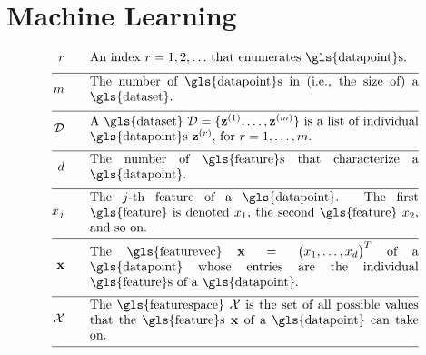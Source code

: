 \newpage
\section*{Machine Learning}

\begin{align}
	\sampleidx \quad\quad & \parbox{.75\textwidth}{An index $\sampleidx=1,2,\ldots$ that 
		enumerates \gls{datapoint}s.}   \nonumber \\[2mm] \hline \nonumber\\[-5mm]
	\samplesize \quad\quad &\parbox{.75\textwidth}{The number of \gls{datapoint}s in (i.e., the size of) a \gls{dataset}.} \nonumber \\[2mm] \hline \nonumber\\[-5mm] 
	\dataset \quad\quad & \parbox{.75\textwidth}{A \gls{dataset} $\dataset = \{ \datapoint^{(1)},\ldots, \datapoint^{(\samplesize)} \}$ 
		is a list of individual \gls{datapoint}s $\datapoint^{(\sampleidx)}$, for $\sampleidx=1,\ldots,\samplesize$.}   \nonumber \\[2mm] \hline \nonumber\\[-5mm]
	\featurelen \quad\quad &\parbox{.75\textwidth}{The number of \gls{feature}s that characterize a \gls{datapoint}.}\nonumber \\[2mm] \hline \nonumber\\[-5mm]
	\feature_{\featureidx} \quad\quad &\parbox{.75\textwidth}{The $\featureidx$-th feature of a \gls{datapoint}. The first \gls{feature} 
		is denoted $\feature_{1}$, the second \gls{feature} $\feature_{2}$, and so on. } \nonumber \\[2mm] \hline \nonumber\\[-5mm] 
	\featurevec \quad\quad &\parbox{.75\textwidth}{The \gls{featurevec} $\featurevec=\big(\feature_{1},\ldots,\feature_{\featuredim}\big)^{T}$ of a \gls{datapoint} whose entries 
		are the individual \gls{feature}s of a \gls{datapoint}.}\nonumber \\[2mm] \hline \nonumber\\[-5mm]
	\featurespace \quad\quad & \parbox{.75\textwidth}{The \gls{featurespace} $\featurespace$ is 
		the set of all possible values that the \gls{feature}s $\featurevec$ of a \gls{datapoint} can take on.} \nonumber \\[2mm] \hline \nonumber\\[-5mm]

\end{align}
